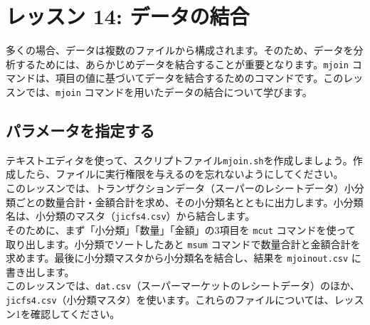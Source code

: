 

%

\section{レッスン 14: データの結合}

多くの場合、データは複数のファイルから構成されます。そのため、データを分析するためには、あらかじめデータを結合することが重要となります。\verb|mjoin| コマンドは、項目の値に基づいてデータを結合するためのコマンドです。このレッスンでは、\verb|mjoin| コマンドを用いたデータの結合について学びます。

\subsection{パラメータを指定する}

テキストエディタを使って、スクリプトファイル\verb|mjoin.sh|を作成しましょう。作成したら、ファイルに実行権限を与えるのを忘れないようにしてください。\\

このレッスンでは、トランザクションデータ（スーパーのレシートデータ）小分類ごとの数量合計・金額合計を求め、その小分類名とともに出力します。小分類名は、小分類のマスタ（\verb|jicfs4.csv|）から結合します。\\

そのために、まず「小分類」「数量」「金額」の3項目を \verb|mcut| コマンドを使って取り出します。小分類でソートしたあと \verb|msum| コマンドで数量合計と金額合計を求めます。最後に小分類マスタから小分類名を結合し、結果を \verb|mjoinout.csv| に書き出します。\\

このレッスンでは、\verb|dat.csv|（スーパーマーケットのレシートデータ）のほか、\verb|jicfs4.csv|（小分類マスタ）を使います。これらのファイルについては、レッスン1を確認してください。


